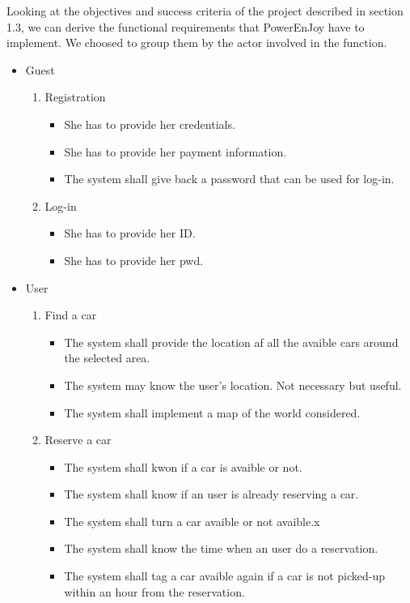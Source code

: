 Looking at the objectives and success criteria of the project described in section 1.3, we can derive the functional requirements that PowerEnJoy have to implement. We choosed to group them by the actor involved in the function.
\begin{itemize}
\item Guest
\begin{enumerate}
	\item Registration
	\begin{itemize}
	\item She has to provide her credentials. 
	\item She has to provide her payment information.
	\item The system shall give back a password that can be used for log-in.

	\end{itemize}
	\item Log-in
	\begin{itemize}
	\item She has to provide her \gls{ID}.
	\item She has to provide her \gls{pwd}.

	\end{itemize}
	
	\end{enumerate}
\item User
\begin{enumerate}
	
	\item Find a car
	\begin{itemize}
	\item The system shall provide the location af all the avaible cars around the selected area.
	\item The system may know the user's location. Not necessary but useful.
	\item The system shall implement a map of the world considered.
	\end{itemize}
	
	\item Reserve a car
	\begin{itemize}
	\item The system shall kwon if a car is avaible or not.
	\item The system shall know if an user is already reserving a car.
	\item The system shall turn a car avaible or not avaible.x
	\item The system shall know the time when an user do a reservation.
	\item The system shall tag a car avaible again if a car is not picked-up within an hour from the reservation.
	\end{itemize}
	

\end{enumerate}
\end{itemize}
